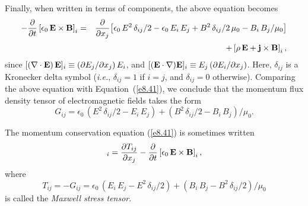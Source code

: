 Finally, when written in terms of components, the above equation becomes
\begin{eqnarray}
-\frac{\partial}{\partial t} \left[\epsilon_0\,{\bf E}\times{\bf B}\right]_i&=&
\frac{\partial}{\partial x_j}\!\left[\epsilon_0\,E^2\,\delta_{ij}/2  - \epsilon_0\,E_i\,E_j+ B^2\,\delta_{ij}/2\,\mu_0 - B_i\,B_j/\mu_0\right]\nonumber\\[0.5ex]&&+
\left[\rho\,{\bf E}+{\bf j}\times {\bf B}\right]_i,
\end{eqnarray}
since $[(\nabla\cdot{\bf E})\,{\bf E}]_i \equiv (\partial E_j/\partial x_j)\,E_i$,
and  $[({\bf E}\cdot\nabla){\bf E}]_i \equiv E_j\,(\partial E_i/\partial x_j)$.
Here, $\delta_{ij}$ is a Kronecker delta symbol ({\em i.e.}, $\delta_{ij}=1$
if $i=j$, and $\delta_{ij}=0$ otherwise).
Comparing the above equation with Equation~(\ref{e8.41}), we conclude that
the momentum flux density tensor of electromagnetic fields takes the
form
\begin{equation}\label{e8.55x}
G_{ij} = \epsilon_0\,(E^2\,\delta_{ij}/2-E_i\,E_j) + (B^2\,\delta_{ij}/2-B_i\,B_j)/ \mu_0.
\end{equation}

The momentum conservation equation (\ref{e8.41}) is sometimes written
\begin{equation}
[\rho\,{\bf E} + {\bf j}\times{\bf B}]_i = \frac {\partial T_{ij}}{\partial x_j}
-\frac{\partial}{\partial t}\left[\epsilon_0\,{\bf E}\times{\bf B}\right]_i,
\end{equation}
where 
\begin{equation}
T_{ij} = - G_{ij} = \epsilon_0\,(E_i\,E_j-E^2\,\delta_{ij}/2) + (B_i\,B_j-B^2\,\delta_{ij}/2)/ \mu_0
\end{equation}
is called the {\em Maxwell stress tensor}.

